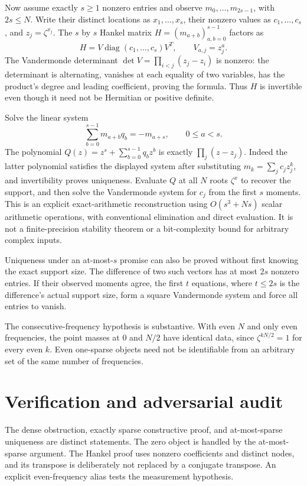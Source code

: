 \documentclass[11pt]{article}
\begin{document}
Now assume exactly $s\geq1$ nonzero entries and observe $m_0,\ldots,m_{2s-1}$, with $2s\leq N$. Write their distinct locations as $x_1,\ldots,x_s$, their nonzero values as $c_1,\ldots,c_s$, and $z_j=\zeta^{x_j}$. The $s$ by $s$ Hankel matrix $H=(m_{a+b})_{a,b=0}^{s-1}$ factors as
\[
 H=V\operatorname{diag}(c_1,\ldots,c_s)V^T,
 \qquad V_{a,j}=z_j^a.
\]
The Vandermonde determinant $\det V=\prod_{i<j}(z_j-z_i)$ is nonzero: the determinant is alternating, vanishes at each equality of two variables, has the product's degree and leading coefficient, proving the formula. Thus $H$ is invertible even though it need not be Hermitian or positive definite.

Solve the linear system
\[
 \sum_{b=0}^{s-1}m_{a+b}q_b=-m_{a+s},\qquad 0\leq a<s.
\]
The polynomial $Q(z)=z^s+\sum_{b=0}^{s-1}q_bz^b$ is exactly $\prod_j(z-z_j)$. Indeed the latter polynomial satisfies the displayed system after substituting $m_k=\sum_jc_jz_j^k$, and invertibility proves uniqueness. Evaluate $Q$ at all $N$ roots $\zeta^x$ to recover the support, and then solve the Vandermonde system for $c_j$ from the first $s$ moments. This is an explicit exact-arithmetic reconstruction using $O(s^3+Ns)$ scalar arithmetic operations, with conventional elimination and direct evaluation. It is not a finite-precision stability theorem or a bit-complexity bound for arbitrary complex inputs.

Uniqueness under an at-most-$s$ promise can also be proved without first knowing the exact support size. The difference of two such vectors has at most $2s$ nonzero entries. If their observed moments agree, the first $t$ equations, where $t\leq2s$ is the difference's actual support size, form a square Vandermonde system and force all entries to vanish.

The consecutive-frequency hypothesis is substantive. With even $N$ and only even frequencies, the point masses at $0$ and $N/2$ have identical data, since $\zeta^{kN/2}=1$ for every even $k$. Even one-sparse objects need not be identifiable from an arbitrary set of the same number of frequencies.
\section{Verification and adversarial audit}
The dense obstruction, exactly sparse constructive proof, and at-most-sparse uniqueness are distinct statements. The zero object is handled by the at-most-sparse argument. The Hankel proof uses nonzero coefficients and distinct nodes, and its transpose is deliberately not replaced by a conjugate transpose. An explicit even-frequency alias tests the measurement hypothesis.
\end{document}
